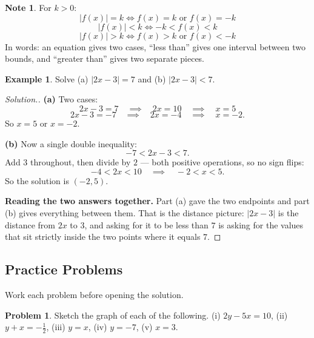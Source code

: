 \documentclass[11pt,a4paper]{article}
\theoremstyle{definition}
\newtheorem{example}[thm]{Example}
\newtheorem{note}[thm]{Note}
\newtheorem{problemx}{Problem}[section]
\newenvironment{problem}{\begin{problemx}}{\end{problemx}}
\newenvironment{solution}
  {\renewcommand{\qedsymbol}{}\begin{proof}[\textit{Solution}.]}
  {\end{proof}}
\begin{document}
\begin{note}
For $k>0$:
$$|f(x)|=k\iff f(x)=k \text{ or } f(x)=-k$$
$$|f(x)|<k\iff -k<f(x)<k$$
$$|f(x)|>k\iff f(x)>k \text{ or } f(x)<-k$$
In words: an equation gives two cases, ``less than'' gives one interval between two
bounds, and ``greater than'' gives two separate pieces.
\end{note}

\begin{example}
Solve (a) $|2x-3|=7$ and (b) $|2x-3|<7$.
\end{example}

\begin{solution}
\textbf{(a)} Two cases:
$$2x-3=7\quad\implies\quad 2x=10\quad\implies\quad x=5$$
$$2x-3=-7\quad\implies\quad 2x=-4\quad\implies\quad x=-2.$$
So $x=5$ or $x=-2$.

\textbf{(b)} Now a single double inequality:
$$-7<2x-3<7.$$
Add $3$ throughout, then divide by $2$ --- both positive operations, so no sign flips:
$$-4<2x<10\quad\implies\quad -2<x<5.$$
So the solution is $(-2,5)$.

\textbf{Reading the two answers together.} Part (a) gave the two endpoints and part (b)
gives everything between them. That is the distance picture: $|2x-3|$ is the distance
from $2x$ to $3$, and asking for it to be less than $7$ is asking for the values that
sit strictly inside the two points where it equals $7$.
\end{solution}


\subsection{Practice Problems}

Work each problem before opening the solution.

\begin{problem}
Sketch the graph of each of the following.
\quad (i) $2y-5x=10$, \quad (ii) $y+x=-\frac{1}{2}$, \quad (iii) $y=x$, \quad
(iv) $y=-7$, \quad (v) $x=3$.
\end{problem}
\end{document}
